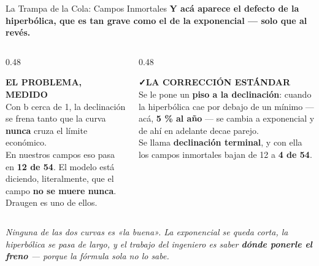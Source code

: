 \documentclass[aspectratio=169, 11pt]{beamer}
\begin{document}
\begin{frame}[shrink=16]{La Trampa de la Cola: Campos Inmortales}
  \vspace{-4pt}
  {\small\color{arcaDark}\bfseries
   Y acá aparece el defecto de la hiperbólica, que es tan grave como el de
   la exponencial --- solo que al revés.}
  \vspace{8pt}
  \begin{columns}[T]
    \begin{column}{0.48\textwidth}
      \begin{tcolorbox}[colback=arcaGray, colframe=arcaRed, boxrule=0pt, leftrule=3pt,
        arc=3pt, left=6pt, right=6pt, top=5pt, bottom=5pt]
        {\scriptsize\color{arcaRed}\bfseries\faExclamationTriangle\hspace{4pt}EL PROBLEMA, MEDIDO}\\[4pt]
        {\scriptsize\color{textMuted}
         Con b cerca de 1, la declinación se frena tanto que la curva
         \textbf{nunca} cruza el límite económico.\\[5pt]
         En nuestros campos eso pasa en {\color{arcaRed}\bfseries 12 de 54}.
         El modelo está diciendo, literalmente, que el campo
         \textbf{no se muere nunca}.\\[5pt]
         Draugen es uno de ellos.}
      \end{tcolorbox}
    \end{column}
    \begin{column}{0.48\textwidth}
      \begin{tcolorbox}[colback=arcaGray, colframe=codeGreen, boxrule=0pt, leftrule=3pt,
        arc=3pt, left=6pt, right=6pt, top=5pt, bottom=5pt]
        {\scriptsize\color{codeGreen}\bfseries\faCheck\hspace{4pt}LA CORRECCIÓN ESTÁNDAR}\\[4pt]
        {\scriptsize\color{textMuted}
         Se le pone un \textbf{piso a la declinación}: cuando la hiperbólica
         cae por debajo de un mínimo --- acá, \textbf{5 \% al año} --- se
         cambia a exponencial y de ahí en adelante decae parejo.\\[5pt]
         Se llama \textbf{declinación terminal}, y con ella los campos
         inmortales bajan de 12 a {\color{codeGreen}\bfseries 4 de 54}.}
      \end{tcolorbox}
    \end{column}
  \end{columns}
  \vspace{8pt}
  {\footnotesize\color{arcaDark}\itshape
   Ninguna de las dos curvas es «la buena». La exponencial se queda corta,
   la hiperbólica se pasa de largo, y el trabajo del ingeniero es saber
   \textbf{dónde ponerle el freno} --- porque la fórmula sola no lo sabe.}
\end{frame}
\end{document}
